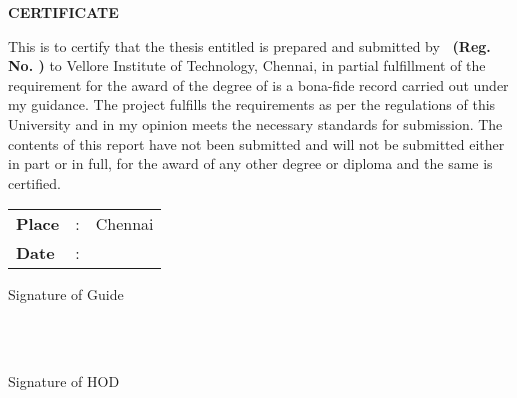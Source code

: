 \thispagestyle{plain}
\begin{center}
{\Large \bf CERTIFICATE}
\end{center}

%
%
This is to certify that the thesis entitled {\bf \printtitle} is prepared and 
submitted by {\bf \thestudent\  
(Reg. No. \theregno)}
to Vellore Institute of Technology, Chennai, in partial fulfillment of the requirement for the award of
the degree of {\bf \theprogrammeLongName} 
is a bona-fide record carried out under my guidance.
The project fulfills the requirements as per the regulations of this
University and in my opinion meets the necessary standards for submission.
The contents of this report have not been submitted and will not be submitted
either in part or in full, for the award of any other degree or diploma
and the same is certified.
%
%

\begingroup
\linespread{1} \selectfont

\vspace{3\baselineskip}

\begin{minipage}{.5\textwidth}
	\raggedright
	\begin{tabular}{lcl}
		\textbf{Place}  & : & Chennai \\
		\textbf{Date} & : &
	\end{tabular}
\end{minipage}%
\begin{minipage}{.5\textwidth}
	\raggedleft
	Signature of Guide\\
	{\bf \theguide}\\
\end{minipage}

\vspace{3\baselineskip}

\begin{minipage}{.5\textwidth}
~
\end{minipage}%
\begin{minipage}{.5\textwidth}
	\raggedleft
	Signature of HOD\\
	{\bf \thehod}\\
\end{minipage}

\endgroup
\raggedbottom
\cleardoublepage
%
%  